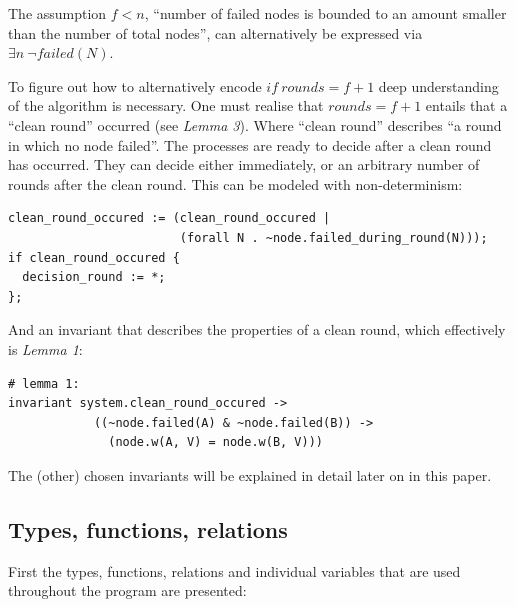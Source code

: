 \documentclass[fleqn]{article}
\begin{document}
The assumption $f<n$, ``number of failed nodes is bounded to an amount smaller than the number of total nodes'', can alternatively be expressed via $\exists n\ \neg failed(N)$.

To figure out how to alternatively encode $if\ rounds = f+1$ deep understanding of the algorithm is necessary. One must realise that $rounds = f+1$ entails that a ``clean round'' occurred (see \textit{Lemma 3}). Where ``clean round'' describes ``a round in which no node failed''. The processes are ready to decide after a clean round has occurred. They can decide either immediately, or an arbitrary number of rounds after the clean round. This can be modeled with non-determinism:

\begin{mdframed}[backgroundcolor=light-gray, roundcorner=10pt,leftmargin=1, rightmargin=1, innerleftmargin=15, innertopmargin=15,innerbottommargin=15, outerlinewidth=1, linecolor=light-gray]
\begin{lstlisting}
clean_round_occured := (clean_round_occured |
                        (forall N . ~node.failed_during_round(N)));
if clean_round_occured {
  decision_round := *;
};
\end{lstlisting}
\end{mdframed}

\noindent And an invariant that describes the properties of a clean round, which effectively is \textit{Lemma 1}:

\begin{mdframed}[backgroundcolor=light-gray, roundcorner=10pt,leftmargin=1, rightmargin=1, innerleftmargin=15, innertopmargin=15,innerbottommargin=15, outerlinewidth=1, linecolor=light-gray]
\begin{lstlisting}
# lemma 1:
invariant system.clean_round_occured ->
            ((~node.failed(A) & ~node.failed(B)) ->
              (node.w(A, V) = node.w(B, V)))
\end{lstlisting}
\end{mdframed}

\noindent The (other) chosen invariants will be explained in detail later on in this paper.

\subsection{Types, functions, relations}
First the types, functions, relations and individual variables that are used throughout the program are presented:
\end{document}

